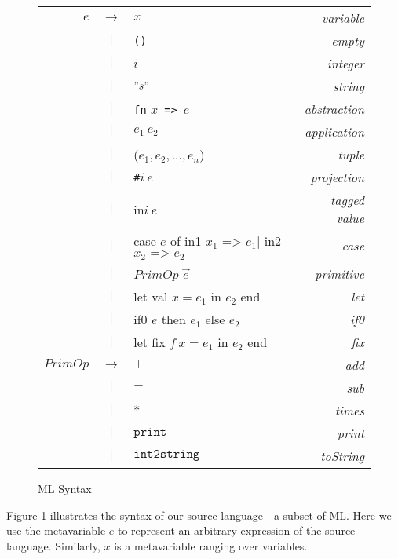 \documentclass{article}
\theoremstyle{definition}
\theoremstyle{remark}
\numberwithin{equation}{section}
\begin{document}
\begin{figure}[!ht]
  \centering
\begin{tabular}{rclr}
$e$ & $\to$ & $x$ & \emph{variable}\\
     & $|$   & \texttt{()} & \emph{empty}\\
     & $|$   & $i$ & \emph{integer}\\
     & $|$   & $"s"$ & \emph{string}\\
     &  $|$  & \texttt{fn} $x$\texttt{ => }$e$ & \emph{abstraction}\\
     &  $|$  & $e_1\ e_2$ & \emph{application}\\
     &  $|$  & ($e_1,e_2, ..., e_n$) & \emph{tuple}\\
     &  $|$  & \texttt{\#}$i\ e$  & \emph{projection}\\
     &  $|$  & \textsf{in}$i\ e$  & \emph{tagged value}\\
     &  $|$  & \textsf{case }$e$ \textsf{of in1 }$x_1\texttt{ => } e_1|$
     \textsf{in2 }$x_2 \texttt{ => } e_2$  & \emph{case}\\
     &  $|$  & $PrimOp\ \vec{e}$ & \emph{primitive}\\
     &  $|$  & \textsf{let val }$x=e_1$\textsf{ in }$e_2$\textsf{ end}
         & \emph{let}\\
     &  $|$  & \textsf{if0 }$e$\textsf{ then }$e_1$\textsf{ else }$e_2$
         & \emph{if0}\\
     &  $|$  & \textsf{let fix }$f\ x=e_1$\textsf{ in }$e_2$\textsf{ end}
         & \emph{fix}\\
$PrimOp$ & $\to$ & $+$ & \emph{add}\\
     & $|$ & $-$ & \emph{sub}\\
     & $|$ & $*$ & \emph{times}\\
     & $|$ & $\texttt{print}$ & \emph{print}\\
     & $|$ & $\texttt{int2string}$ & \emph{toString}\\

\end{tabular}
  \caption{ML Syntax}
  \label{fig-sub}
\end{figure}

Figure 1 illustrates the syntax of our source language - a subset
 of ML. Here we use the metavariable $e$ to represent an arbitrary
 expression of the source language. Similarly, $x$ is a metavariable
ranging over variables.
\end{document}
